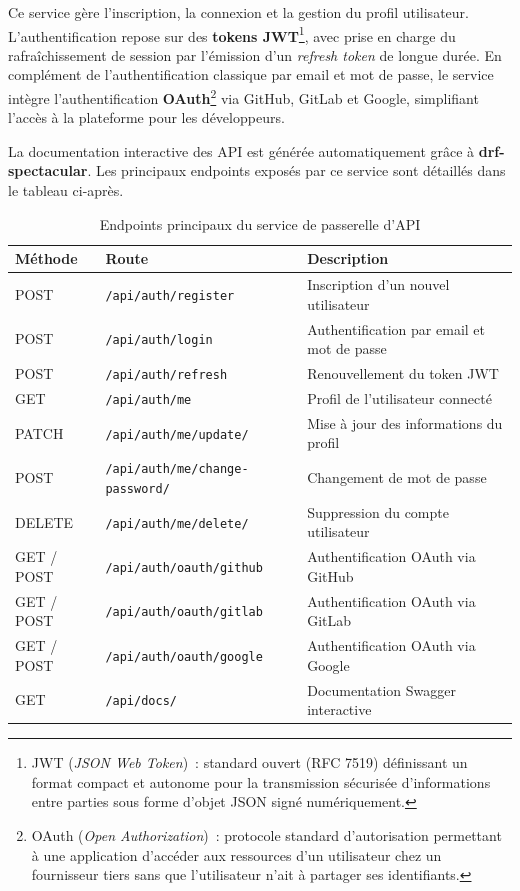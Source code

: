 Ce service gère l'inscription, la connexion et la gestion du profil utilisateur. L'authentification
repose sur des \textbf{tokens JWT}\footnote{JWT (\textit{JSON Web Token})~: standard ouvert (RFC
7519) définissant un format compact et autonome pour la transmission sécurisée d'informations entre
parties sous forme d'objet JSON signé numériquement.}, avec prise en charge du rafraîchissement
de session par l'émission d'un \textit{refresh token} de longue durée. En complément de
l'authentification classique par email et mot de passe, le service intègre l'authentification
\textbf{OAuth}\footnote{OAuth (\textit{Open Authorization})~: protocole standard d'autorisation
permettant à une application d'accéder aux ressources d'un utilisateur chez un fournisseur tiers
sans que l'utilisateur n'ait à partager ses identifiants.} via GitHub, GitLab et Google,
simplifiant l'accès à la plateforme pour les développeurs.

La documentation interactive des API est générée automatiquement grâce à
\textbf{drf-spectacular}. Les principaux endpoints exposés par ce service sont détaillés dans
le tableau ci-après.

\begin{table}[H]
\centering
\small
\caption{Endpoints principaux du service de passerelle d'API}
\label{tab:endpoints-gateway}
\begin{tabular}{|>{\centering\arraybackslash}p{1.6cm}
                |>{\raggedright\arraybackslash}p{6.2cm}
                |>{\raggedright\arraybackslash}p{4.8cm}|}
\hline
\textbf{Méthode} & \textbf{Route} & \textbf{Description} \\
\hline
POST & \texttt{/api/auth/register} & Inscription d'un nouvel utilisateur \\
\hline
POST & \texttt{/api/auth/login} & Authentification par email et mot de passe \\
\hline
POST & \texttt{/api/auth/refresh} & Renouvellement du token JWT \\
\hline
GET & \texttt{/api/auth/me} & Profil de l'utilisateur connecté \\
\hline
PATCH & \texttt{/api/auth/me/update/} & Mise à jour des informations du profil \\
\hline
POST & \texttt{/api/auth/me/change-password/} & Changement de mot de passe \\
\hline
DELETE & \texttt{/api/auth/me/delete/} & Suppression du compte utilisateur \\
\hline
GET / POST & \texttt{/api/auth/oauth/github} & Authentification OAuth via GitHub \\
\hline
GET / POST & \texttt{/api/auth/oauth/gitlab} & Authentification OAuth via GitLab \\
\hline
GET / POST & \texttt{/api/auth/oauth/google} & Authentification OAuth via Google \\
\hline
GET & \texttt{/api/docs/} & Documentation Swagger interactive \\
\hline
\end{tabular}
\end{table}

